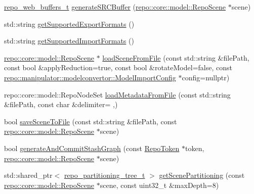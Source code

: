 \begin{DoxyCompactItemize}
\item 
\hyperlink{structrepo__web__buffers__t}{repo\+\_\+web\+\_\+buffers\+\_\+t} \hyperlink{classrepo_1_1_repo_controller_a4544cc6169d7673367bd556437e28bda}{generate\+S\+R\+C\+Buffer} (\hyperlink{classrepo_1_1core_1_1model_1_1_repo_scene}{repo\+::core\+::model\+::\+Repo\+Scene} $\ast$scene)
\item 
std\+::string \hyperlink{classrepo_1_1_repo_controller_a97aec698d028a6e4010288e2d41dbe53}{get\+Supported\+Export\+Formats} ()
\item 
std\+::string \hyperlink{classrepo_1_1_repo_controller_a8677537cfcac9d03e8b8f5899ea1248b}{get\+Supported\+Import\+Formats} ()
\item 
\hyperlink{classrepo_1_1core_1_1model_1_1_repo_scene}{repo\+::core\+::model\+::\+Repo\+Scene} $\ast$ \hyperlink{classrepo_1_1_repo_controller_a7c690bcce2f6657a42e7b275baba3afd}{load\+Scene\+From\+File} (const std\+::string \&file\+Path, const bool \&apply\+Reduction=true, const bool \&rotate\+Model=false, const \hyperlink{classrepo_1_1manipulator_1_1modelconvertor_1_1_model_import_config}{repo\+::manipulator\+::modelconvertor\+::\+Model\+Import\+Config} $\ast$config=nullptr)
\item 
repo\+::core\+::model\+::\+Repo\+Node\+Set \hyperlink{classrepo_1_1_repo_controller_a9393b76909a0bc9ca1ffbe894b5c564f}{load\+Metadata\+From\+File} (const std\+::string \&file\+Path, const char \&delimiter= \textquotesingle{},\textquotesingle{})
\item 
bool \hyperlink{classrepo_1_1_repo_controller_aa6db65779f11f14acbb1b5cef39c0e6b}{save\+Scene\+To\+File} (const std\+::string \&file\+Path, const \hyperlink{classrepo_1_1core_1_1model_1_1_repo_scene}{repo\+::core\+::model\+::\+Repo\+Scene} $\ast$scene)
\item 
bool \hyperlink{classrepo_1_1_repo_controller_a6de636587993864298273bfd6e95dd6b}{generate\+And\+Commit\+Stash\+Graph} (const \hyperlink{class_repo_controller_1_1_repo_token}{Repo\+Token} $\ast$token, \hyperlink{classrepo_1_1core_1_1model_1_1_repo_scene}{repo\+::core\+::model\+::\+Repo\+Scene} $\ast$scene)
\item 
std\+::shared\+\_\+ptr$<$ \hyperlink{structrepo__partitioning__tree__t}{repo\+\_\+partitioning\+\_\+tree\+\_\+t} $>$ \hyperlink{classrepo_1_1_repo_controller_a440edca705154b92f1a1fd7d40a1d243}{get\+Scene\+Partitioning} (const \hyperlink{classrepo_1_1core_1_1model_1_1_repo_scene}{repo\+::core\+::model\+::\+Repo\+Scene} $\ast$scene, const uint32\+\_\+t \&max\+Depth=8)
\item 

\end{DoxyCompactItemize}
